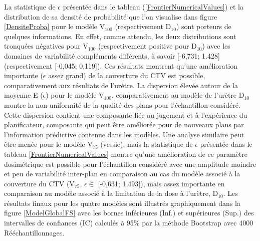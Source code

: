La statistique de $\epsilon$ présentée dans le tableau (\ref{FrontierNumericalValues}) et la distribution de sa densité de probabilité que l'on visualise dans figure \ref{DensiteProba} pour le modèle V$_{100}$ (respectivement D$_{10}$) sont porteurs de quelques informations. En effet, comme attendu, les deux distributions sont tronquées négatives pour V$_{100}$ (respectivement positive pour D$_{10}$) avec les domaines de variabilité compléments différents, à savoir [-6,731; 1.428] (respectivement [-0,045; 0,119]). Ces résultats montrent qu'une amélioration importante ($\epsilon$ assez grand) de la couverture du CTV est possible, comparativement aux résultats de l'urètre. La dispersion élevée autour de la moyenne E ($\epsilon$)  pour le modèle V$_{100}$, comparativement au modèle de l'urètre D$_{10}$ montre la non-uniformité de la qualité des plans pour l'échantillon considéré. Cette dispersion contient une composante liée au jugement et à l'expérience du planificateur, composante qui peut être améliorée pour de nouveaux plans par l'information prédictive contenue dans les modèles. Une analyse similaire peut être menée pour le modèle V$_{75}$ (vessie), mais la statistique de $\epsilon$ présentée dans le tableau \ref{FrontierNumericalValues} montre qu’une amélioration de ce paramètre dosimétrique est possible pour l’échantillon considéré avec une amplitude moindre et peu de variabilité inter-plan en comparaison au cas du modèle associé à la couverture du CTV (V$_{75}$, $\epsilon \in$ [-0,631; 1,493]), mais assez importante en comparaison au modèle associé à la limitation de la dose à l’urètre, D$_{10}$. Les résultats finaux pour les quatre modèles sont illustrés graphiquement dans la figure \ref{ModelGlobalFS} avec les bornes inférieures (Inf.) et supérieures (Sup.) des intervalles de confiances (IC) calculés à 95\% par la méthode Bootstrap avec 4000 Rééchantillonnages. 
%
